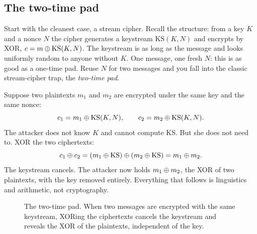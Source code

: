 \subsection{The two-time pad}
\label{ch38:two-time-pad}

Start with the cleanest case, a stream cipher. Recall the structure: from a key $K$ and a nonce $N$ the cipher generates a keystream $\mathrm{KS}(K,N)$ and encrypts by XOR, $c = m \oplus \mathrm{KS}(K,N)$. The keystream is as long as the message and looks uniformly random to anyone without $K$. One message, one fresh $N$: this is as good as a one-time pad. Reuse $N$ for two messages and you fall into the classic stream-cipher trap, the \emph{two-time pad}.

Suppose two plaintexts $m_1$ and $m_2$ are encrypted under the same key and the same nonce:
\[
c_1 = m_1 \oplus \mathrm{KS}(K,N), \qquad c_2 = m_2 \oplus \mathrm{KS}(K,N).
\]
The attacker does not know $K$ and cannot compute $\mathrm{KS}$. But she does not need to. XOR the two ciphertexts:
\[
c_1 \oplus c_2 = (m_1 \oplus \mathrm{KS}) \oplus (m_2 \oplus \mathrm{KS}) = m_1 \oplus m_2.
\]
The keystream cancels. The attacker now holds $m_1 \oplus m_2$, the XOR of two plaintexts, with the key removed entirely. Everything that follows is linguistics and arithmetic, not cryptography.

\begin{figure}[htbp]
\centering
{}
\caption{The two-time pad. When two messages are encrypted with the same keystream, XORing the ciphertexts cancels the keystream and reveals the XOR of the plaintexts, independent of the key.}
\label{ch38:fig-two-time}
\end{figure}

